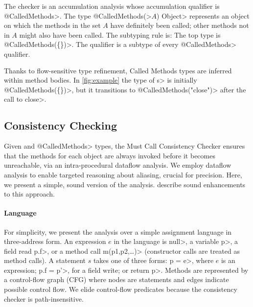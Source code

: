 The checker is an accumulation analysis whose accumulation qualifier is \<@CalledMethods>.
The type \<@CalledMethods(>$A$\<) Object>
represents an object on which the methods in the set $A$ have definitely
been called; other methods not in $A$ might also have been called.
The subtyping
rule is:
The top type is \<@CalledMethods(\{\})>.
The qualifier \CalledMethodsBottom is a subtype of every \<@CalledMethods> qualifier.

Thanks to flow-sensitive type refinement,
Called Methods types are inferred within method bodies.
In \cref{fig:example} the type of \<s> is initially \<@CalledMethods(\{\})>,
but it transitions to \<@CalledMethods("close")> after the call to \<close>.


\subsection{Consistency Checking}
\label{sec:must-call-invoked}

Given \MustCall and \<@CalledMethods> types, the Must
Call Consistency Checker ensures that the \MustCall methods for each object
are always invoked before it becomes unreachable,
via an intra-procedural dataflow analysis.  We employ dataflow analysis to
enable targeted reasoning about aliasing, crucial for precision.  Here, we present
a simple, sound version of the analysis.
describe sound enhancements to this approach.

\paragraph{Language} For simplicity, we present the analysis over a simple
assignment language in three-address form.  An expression $e$ in the language is
\<null>, a variable \<p>, a field read \<p.f>, or a method call \<m(p1,p2,\ldots)> (constructor
calls are treated as method calls).  A statement $s$ takes one of three forms:
\<p = e>, where $e$ is an expression; \<p.f = p'>, for a field write; or
\<return p>.  Methods are represented by a control-flow graph (CFG) where nodes
are statements and edges indicate possible control flow.  We elide control-flow
predicates because the consistency checker is path-insensitive.


